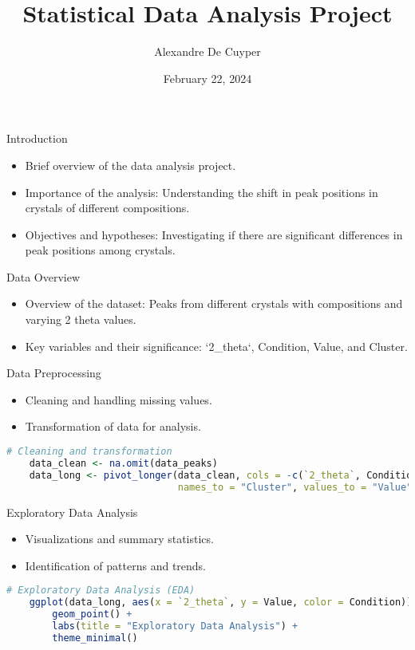 \documentclass{beamer}
\title{Statistical Data Analysis Project}
\author{Alexandre De Cuyper}
\date{February 22, 2024}
\institute{University of A Coruña}
\begin{document}
\frame{\titlepage}

\begin{frame}{Introduction}
    \begin{itemize}
        \item Brief overview of the data analysis project.
        \item Importance of the analysis: Understanding the shift in peak positions in crystals of different compositions.
        \item Objectives and hypotheses: Investigating if there are significant differences in peak positions among crystals.
    \end{itemize}
\end{frame}

\begin{frame}{Data Overview}
    \begin{itemize}
        \item Overview of the dataset: Peaks from different crystals with compositions and varying 2 theta values.
        \item Key variables and their significance: `2_theta`, Condition, Value, and Cluster.
    \end{itemize}
\end{frame}

\begin{frame}[fragile]{Data Preprocessing}
    \begin{itemize}
        \item Cleaning and handling missing values.
        \item Transformation of data for analysis.
    \end{itemize}

    \begin{lstlisting}[language=R]
    # Cleaning and transformation
    data_clean <- na.omit(data_peaks)
    data_long <- pivot_longer(data_clean, cols = -c(`2_theta`, Condition), 
                              names_to = "Cluster", values_to = "Value")
    \end{lstlisting}
\end{frame}

\begin{frame}[fragile]{Exploratory Data Analysis}
    \begin{itemize}
        \item Visualizations and summary statistics.
        \item Identification of patterns and trends.
    \end{itemize}

    \begin{lstlisting}[language=R]
    # Exploratory Data Analysis (EDA)
    ggplot(data_long, aes(x = `2_theta`, y = Value, color = Condition)) +
        geom_point() +
        labs(title = "Exploratory Data Analysis") +
        theme_minimal()
    \end{lstlisting}
\end{frame}
\end{document}
